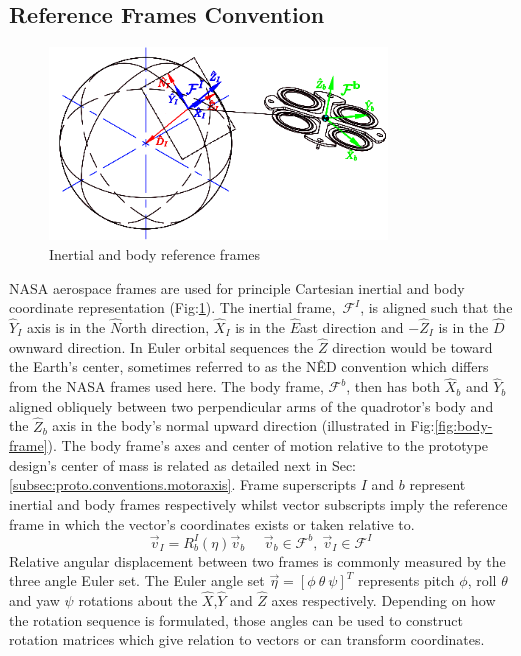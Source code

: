 \subsection{Reference Frames Convention}
\label{subsec:proto.conventions.frames}
\begin{figure}[htbp]
\centering
\includegraphics[width=0.8\textwidth]{figs/reference-frame}
\caption{Inertial and body reference frames}
\label{fig:ref_frame}
\end{figure}
NASA aerospace frames are used for principle Cartesian inertial and body coordinate representation (Fig:\ref{fig:ref_frame}). The inertial frame,~$\mathcal{F}^I$, is aligned such that the $\hat{Y}_I$ axis is in the $\hat{N}$orth direction, $\hat{X}_I$ is in the $\hat{E}$ast direction and $-\hat{Z}_I$ is  in the $\hat{D}$ownward direction. In Euler orbital sequences the $\hat{Z}$ direction would be toward the Earth's center, sometimes referred to as the N\^{E}D convention which differs from the NASA frames used here. The body frame, $\mathcal{F}^b$, then has both $\hat{X}_b$ and $\hat{Y}_b$ aligned obliquely between two perpendicular arms of the quadrotor's body and the $\hat{Z}_b$ axis in the body's normal upward direction (illustrated in Fig:\ref{fig:body-frame}). The body frame's axes and center of motion relative to the prototype design's center of mass is related as detailed next in Sec:\ref{subsec:proto.conventions.motoraxis}. Frame superscripts $I$ and $b$ represent inertial and body frames respectively whilst vector subscripts imply the reference frame in which the vector's coordinates exists or taken relative to. 
\begin{equation}
\vec{v}_I=R_b^I(\eta)\vec{v}_b~~~~~~\vec{v}_b\in\mathcal{F}^b,~\vec{v}_I\in\mathcal{F}^I
\end{equation}
Relative angular displacement between two frames is commonly measured by the three angle Euler set. The Euler angle set $\vec{\eta}=[\phi ~\theta ~\psi]^T$ represents pitch $\phi$, roll $\theta$ and yaw $\psi$ rotations about the $\hat{X}$,$\hat{Y}$ and $\hat{Z}$ axes respectively. Depending on how the rotation sequence is formulated, those angles can be used to construct rotation matrices which give relation to vectors or can transform coordinates. 
